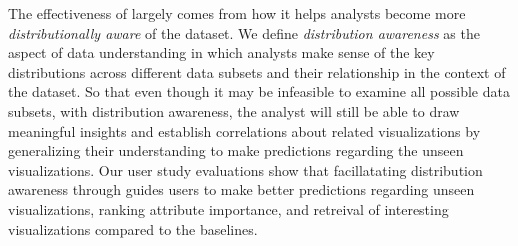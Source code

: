 \par The effectiveness of \sbd largely comes from how it helps analysts become more \emph{distributionally aware} of the dataset. We define \emph{distribution awareness} as the aspect of data understanding in which analysts make sense of the key distributions across different data subsets and their relationship in the context of the dataset. So that even though it may be infeasible to examine all possible data subsets, with distribution awareness, the analyst will still be able to draw meaningful insights and establish correlations about related visualizations by generalizing their understanding to make predictions regarding the unseen visualizations. Our user study evaluations show that facillatating distribution awareness through \sbd guides users to make better predictions regarding unseen visualizations, ranking attribute importance, and retreival of interesting visualizations compared to the baselines.
